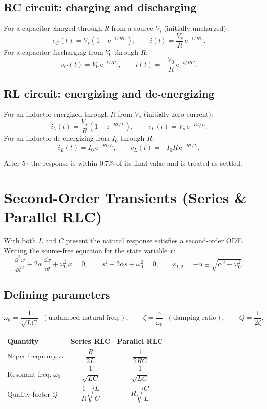 \documentclass{essay}
\newcommand{\ee}{\mathrm{e}}
\begin{document}
\subsection{RC circuit: charging and discharging}
For a capacitor charged through $R$ from a source $V_s$ (initially uncharged):
\[
  v_C(t) = V_s\!\left(1-\ee^{-t/RC}\right), \qquad
  i(t) = \frac{V_s}{R}\,\ee^{-t/RC}.
\]
For a capacitor discharging from $V_0$ through $R$:
\[
  v_C(t) = V_0\,\ee^{-t/RC}, \qquad
  i(t) = -\frac{V_0}{R}\,\ee^{-t/RC}.
\]

\subsection{RL circuit: energizing and de-energizing}
For an inductor energized through $R$ from $V_s$ (initially zero current):
\[
  i_L(t) = \frac{V_s}{R}\!\left(1-\ee^{-Rt/L}\right), \qquad
  v_L(t) = V_s\,\ee^{-Rt/L}.
\]
For an inductor de-energizing from $I_0$ through $R$:
\[
  i_L(t) = I_0\,\ee^{-Rt/L}, \qquad
  v_L(t) = -I_0 R\,\ee^{-Rt/L}.
\]

After $5\tau$ the response is within $0.7\%$ of its final value and is treated
as settled.

\section{Second-Order Transients (Series \& Parallel RLC)}

With both $L$ and $C$ present the natural response satisfies a second-order
ODE. Writing the source-free equation for the state variable $x$:
\[
  \frac{\dd^2 x}{\dd t^2} + 2\alpha\,\frac{\dd x}{\dd t} + \omega_0^2\,x = 0,
  \qquad
  s^2 + 2\alpha s + \omega_0^2 = 0,
  \qquad
  s_{1,2} = -\alpha \pm \sqrt{\alpha^2 - \omega_0^2}.
\]

\subsection{Defining parameters}
\[
  \omega_0 = \frac{1}{\sqrt{LC}} \;\;(\text{undamped natural freq.}),
  \qquad
  \zeta = \frac{\alpha}{\omega_0} \;\;(\text{damping ratio}),
  \qquad
  Q = \frac{1}{2\zeta}.
\]
\begin{center}
  \begin{tabular}{@{}lcc@{}}
    \hline
    \textbf{Quantity} & \textbf{Series RLC} & \textbf{Parallel RLC}\\
    \hline
    Neper frequency $\alpha$ & $\dfrac{R}{2L}$ & $\dfrac{1}{2RC}$\\
    Resonant freq. $\omega_0$ & $\dfrac{1}{\sqrt{LC}}$ &
    $\dfrac{1}{\sqrt{LC}}$\\
    Quality factor $Q$ & $\dfrac{1}{R}\sqrt{\dfrac{L}{C}}$ &
    $R\sqrt{\dfrac{C}{L}}$\\
    \hline
  \end{tabular}
\end{center}
\end{document}

